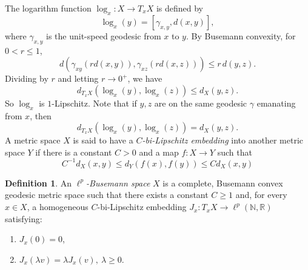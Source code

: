 \documentclass{article}
\theoremstyle{plain}
\theoremstyle{definition}
\newtheorem{definition}[theorem]{Definition}
\theoremstyle{remark}
\begin{document}
	The logarithm function $\log_x: X\to T_xX$ is defined by 
	$$\log_x(y)=[\gamma_{x,y}, d(x,y)],$$
	where $\gamma_{x,y}$ is the unit-speed geodesic from $x$ to $y$. By Busemann convexity, for $0<r\leq 1$,
	$$d(\gamma_{xy}(r d(x,y)),\gamma_{xz}(r d(x,z)))\leq r\,d(y,z).$$
	Dividing by $r$ and letting $r\to 0^+$, we have 
	$$ d_{T_xX}(\log_x(y),\log_x(z))\leq d_X(y,z).$$
	So $\log_x$ is $1$-Lipschitz. Note that if $y,z$ are on the same geodesic $\gamma$ emanating from $x$, then
	$$ d_{T_xX}(\log_x(y),\log_x(z))= d_X(y,z).$$
	A metric space $X$ is said to have a \emph{$C$-bi-Lipschitz embedding} into another metric space $Y$ if there is a constant $C>0$ and a map $f:X \to Y$ such that $$C^{-1}d_X(x,y)\leq d_Y(f(x),f(y))\leq Cd_X(x,y)$$
	\begin{definition}
		An \emph{$\ell^p$-Busemann space} $X$ is a complete,
		Busemann convex geodesic metric space such that
		there exists a constant $C\geq 1$ and, for every
		$x\in X$, a homogeneous $C$-bi-Lipschitz embedding $J_x:T_xX\longrightarrow\ell^p(\mathbb N,\mathbb R)$
		satisfying:
		\begin{enumerate}
			\item $J_x(0)=0$,
			\item $J_x(\lambda v)=\lambda J_x(v),\  \lambda\geq0.$
		\end{enumerate}
	\end{definition}
	
\end{document}
